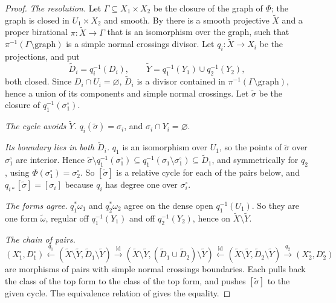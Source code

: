 \documentclass[11pt]{article}
\theoremstyle{plain}
\theoremstyle{definition}
\theoremstyle{remark}
\begin{document}
\begin{proof}
\emph{The resolution.} Let $\Gamma\subseteq X_1\times X_2$ be the closure of the graph of $\Phi$; the graph is closed in $U_1\times X_2$ and smooth. By \cite{Hi} there is a smooth projective $\widetilde X$ and a proper birational $\pi:\widetilde X\to\Gamma$ that is an isomorphism over the graph, such that $\pi^{-1}(\Gamma\setminus\mathrm{graph})$ is a simple normal crossings divisor. Let $q_i:\widetilde X\to X_i$ be the projections, and put
\[
\widetilde D_i=q_i^{-1}(D_i),\qquad \widetilde Y=q_1^{-1}(Y_1)\cup q_2^{-1}(Y_2),
\]
both closed. Since $D_i\cap U_i=\varnothing$, $\widetilde D_i$ is a divisor contained in $\pi^{-1}(\Gamma\setminus\mathrm{graph})$, hence a union of its components and simple normal crossings. Let $\widetilde\sigma$ be the closure of $q_1^{-1}(\sigma_1^\circ)$.

\emph{The cycle avoids $\widetilde Y$.} $q_i(\widetilde\sigma)=\sigma_i$, and $\sigma_i\cap Y_i=\varnothing$.

\emph{Its boundary lies in both $\widetilde D_i$.} $q_1$ is an isomorphism over $U_1$, so the points of $\widetilde\sigma$ over $\sigma_1^\circ$ are interior. Hence $\widetilde\sigma\setminus q_1^{-1}(\sigma_1^\circ)\subseteq q_1^{-1}(\sigma_1\setminus\sigma_1^\circ)\subseteq\widetilde D_1$, and symmetrically for $q_2$, using $\Phi(\sigma_1^\circ)=\sigma_2^\circ$. So $[\widetilde\sigma]$ is a relative cycle for each of the pairs below, and $q_{i\ast}[\widetilde\sigma]=[\sigma_i]$ because $q_i$ has degree one over $\sigma_i^\circ$.

\emph{The forms agree.} $q_1^\ast\omega_1$ and $q_2^\ast\omega_2$ agree on the dense open $q_1^{-1}(U_1)$. So they are one form $\widetilde\omega$, regular off $q_1^{-1}(Y_1)$ and off $q_2^{-1}(Y_2)$, hence on $\widetilde X\setminus\widetilde Y$.

\emph{The chain of pairs.}
\[
(X_1^\circ,D_1^\circ)\xleftarrow{\ q_1\ }(\widetilde X\setminus\widetilde Y,\widetilde D_1\setminus\widetilde Y)\xrightarrow{\ \mathrm{id}\ }(\widetilde X\setminus\widetilde Y,(\widetilde D_1\cup\widetilde D_2)\setminus\widetilde Y)\xleftarrow{\ \mathrm{id}\ }(\widetilde X\setminus\widetilde Y,\widetilde D_2\setminus\widetilde Y)\xrightarrow{\ q_2\ }(X_2^\circ,D_2^\circ)
\]
are morphisms of pairs with simple normal crossings boundaries. Each pulls back the class of the top form to the class of the top form, and pushes $[\widetilde\sigma]$ to the given cycle. The equivalence relation of \cite[\S2.2(ii)]{B1} gives the equality.
\end{proof}
\end{document}
